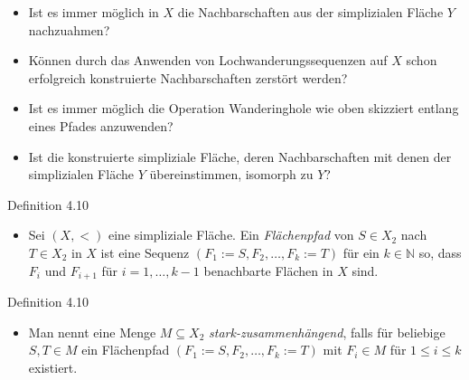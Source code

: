 \documentclass{beamer}
\begin{document}
\begin{frame}
\begin{itemize}
\item Ist es immer möglich in $X$ die Nachbarschaften aus der simplizialen Fläche $Y$ nachzuahmen?\pause
\item Können durch das Anwenden von Lochwanderungssequenzen auf $X$ schon erfolgreich konstruierte Nachbarschaften zerstört werden?\pause
\item Ist es immer möglich die Operation Wanderinghole wie oben skizziert entlang eines Pfades anzuwenden? \pause
\item Ist die konstruierte simpliziale Fläche, deren Nachbarschaften mit denen der simplizialen Fläche $Y$ übereinstimmen, isomorph zu $Y$? 
\end{itemize}
\end{frame}

\begin{frame}
\end{frame}

\begin{frame}
\begin{block}{Definition 4.10}
\begin{itemize}
\item Sei $(X,<)$ eine simpliziale Fläche. Ein \emph{Flächenpfad} von $S\in X_{2}$ nach $T \in X_{2}$ in $X$ ist eine Sequenz $(F_1:=S,F_{2},\ldots,F_{k}:=T)$ für ein $k \in \mathbb{N}$ so, dass $F_{i} $ und $F_{i+1}$ für $i=1,\ldots,k-1$ benachbarte Flächen in $X$ sind.
\end{itemize}
\end{block}
\end{frame}
\begin{frame}
\begin{block}{Definition 4.10}
\begin{itemize}
\item Man nennt eine Menge $M\subseteq X_2$  \emph{stark-zusammenhängend}, falls für beliebige $S,T \in M$ ein Flächenpfad $(F_{1}:=S,F_{2},\ldots,F_{k}:=T)$ mit $F_i \in M$ für $1\leq i \leq k$ existiert. 
\end{itemize}
\end{block}
\end{frame}
\end{document}
